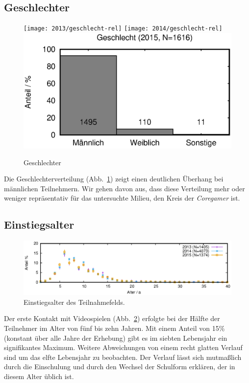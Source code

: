 \documentclass[11pt]{scrartcl}
\begin{document}
\subsection{Geschlechter}

\begin{figure}[htb]
	\centering
	\texttt{[image: 2013/geschlecht-rel]}\hfill
	\texttt{[image: 2014/geschlecht-rel]}\hfill
	\includegraphics[width=0.33\linewidth]{2015/geschlecht-rel}
	\caption{Geschlechter}
	\label{fig: geschlecht}
\end{figure}

Die Geschlechterverteilung (Abb.~\ref{fig: geschlecht})
zeigt einen deutlichen Überhang bei männlichen Teilnehmern.
Wir gehen davon aus, dass diese Verteilung mehr oder weniger repräsentativ
für das untersuchte Milieu, den Kreis der \emph{Coregamer} ist.


\subsection{Einstiegsalter}

\begin{figure}[htb]
	\centering
	\includegraphics[width=15cm]{vgl/einstiegsalter}
	\caption[Einstiegsalter]
	{Einstiegsalter des Teilnahmefelds.}
	\label{fig: einstiegsalter}
\end{figure}

Der erste Kontakt mit Videospielen (Abb.~\ref{fig: einstiegsalter})
erfolgte bei der Hälfte der Teilnehmer im Alter von fünf bis zehn Jahren.
Mit einem Anteil von 15\% (konstant über alle Jahre der Erhebung)
gibt es im siebten Lebensjahr ein signifikantes Maximum.
Weitere Abweichungen von einem recht glatten Verlauf sind um das elfte
Lebensjahr zu beobachten.
Der Verlauf lässt sich mutmaßlich durch die Einschulung und durch den
Wechsel der Schulform erklären, der in diesem Alter üblich ist.
\end{document}
